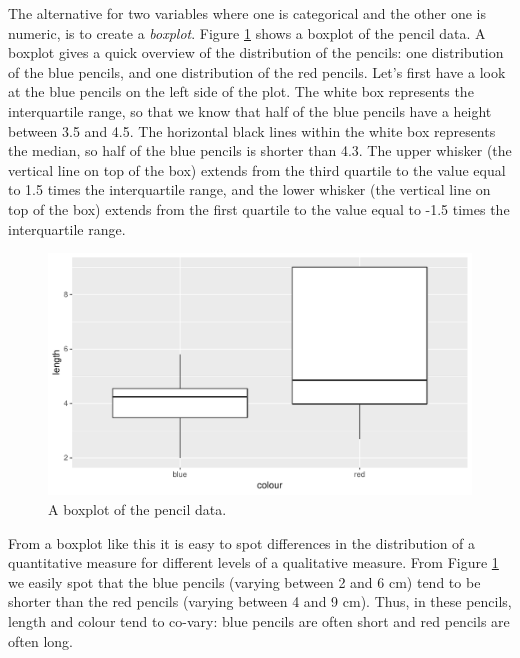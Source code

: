 \documentclass[]{book}\usepackage[]{graphicx}\usepackage[]{color}
\makeatletter
\def\maxwidth{ %
  \ifdim\Gin@nat@width>\linewidth
    \linewidth
  \else
    \Gin@nat@width
  \fi
}
\makeatother
\begin{document}
The alternative for two variables where one is categorical and the other one is numeric, is to create a \textit{boxplot}. Figure \ref{fig:crosstable_3} shows a boxplot of the pencil data. A boxplot gives a quick overview of the distribution of the pencils: one distribution of the blue pencils, and one distribution of the red pencils. Let's first have a look at the blue pencils on the left side of the plot. The white box represents the interquartile range, so that we know that half of the blue pencils have a height between 3.5 and 4.5. The horizontal black lines within the white box represents the median, so half of the blue pencils is shorter than 4.3. The upper whisker (the vertical line on top of the box) extends from the third quartile to the value equal to 1.5 times the interquartile range, and the lower whisker (the vertical line on top of the box) extends from the first quartile to the value equal to -1.5 times the interquartile range.

\begin{figure}

{\centering \includegraphics[width=\maxwidth]{figure/crosstable_3-1} 

}

\caption[A boxplot of the pencil data]{A boxplot of the pencil data.}\label{fig:crosstable_3}
\end{figure}



From a boxplot like this it is easy to spot differences in the distribution of a quantitative measure for different levels of a qualitative measure. From Figure \ref{fig:crosstable_3} we easily spot that the blue pencils (varying between 2 and 6 cm) tend to be shorter than the red pencils (varying between 4 and 9 cm). Thus, in these pencils, length and colour tend to co-vary: blue pencils are often short and red pencils are often long.
\end{document}
